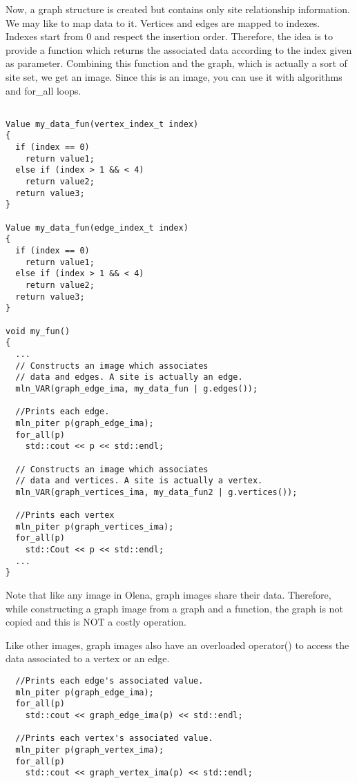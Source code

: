 \documentclass{report}
\begin{document}
Now, a graph structure is created but contains only site relationship
information. We may like to map data to it. Vertices and edges are mapped to
indexes. Indexes start from 0 and respect the insertion order.
Therefore, the idea is to provide a function which returns the associated data
according to the index given as parameter. Combining this function and the
graph, which is actually a sort of site set, we get an image. Since this is an
image, you can use it with algorithms and for\_all loops.

\begin{lstlisting}[frame=single]

Value my_data_fun(vertex_index_t index)
{
  if (index == 0)
    return value1;
  else if (index > 1 && < 4)
    return value2;
  return value3;
}

Value my_data_fun(edge_index_t index)
{
  if (index == 0)
    return value1;
  else if (index > 1 && < 4)
    return value2;
  return value3;
}

void my_fun()
{
  ...
  // Constructs an image which associates
  // data and edges. A site is actually an edge.
  mln_VAR(graph_edge_ima, my_data_fun | g.edges());

  //Prints each edge.
  mln_piter p(graph_edge_ima);
  for_all(p)
    std::cout << p << std::endl;

  // Constructs an image which associates
  // data and vertices. A site is actually a vertex.
  mln_VAR(graph_vertices_ima, my_data_fun2 | g.vertices());

  //Prints each vertex
  mln_piter p(graph_vertices_ima);
  for_all(p)
    std::Cout << p << std::endl;
  ...
}
\end{lstlisting}

Note that like any image in Olena, graph images share their data. Therefore,
while constructing a graph image from a graph and a function, the graph is not
copied and this is NOT a costly operation.

Like other images, graph images also have an overloaded operator() to access the
data associated to a vertex or an edge.
\begin{lstlisting}
  //Prints each edge's associated value.
  mln_piter p(graph_edge_ima);
  for_all(p)
    std::cout << graph_edge_ima(p) << std::endl;

  //Prints each vertex's associated value.
  mln_piter p(graph_vertex_ima);
  for_all(p)
    std::cout << graph_vertex_ima(p) << std::endl;
\end{lstlisting}
\end{document}
